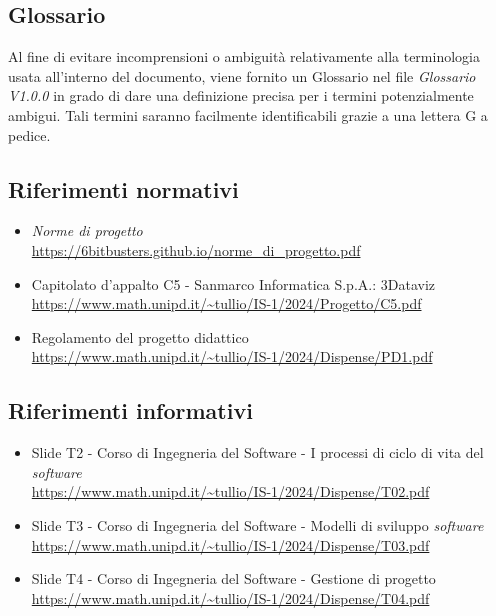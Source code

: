 \subsection{Glossario}
Al fine di evitare incomprensioni o ambiguità relativamente alla terminologia
usata all'interno del documento, viene fornito un Glossario nel file
\textit{Glossario V1.0.0} in grado di dare una definizione precisa per i
termini potenzialmente ambigui. Tali termini saranno facilmente identificabili
grazie a una lettera G a pedice.
\subsection{Riferimenti normativi}
\begin{itemize}
      \item \textit{Norme di progetto} \\ \url{https://6bitbusters.github.io/norme_di_progetto.pdf}
      \item Capitolato d'appalto C5 - Sanmarco Informatica S.p.A.: 3Dataviz \\ \url{https://www.math.unipd.it/~tullio/IS-1/2024/Progetto/C5.pdf}
      \item Regolamento del progetto didattico \\ \url{https://www.math.unipd.it/~tullio/IS-1/2024/Dispense/PD1.pdf}
\end{itemize}
\subsection{Riferimenti informativi}
\begin{itemize}
      \item Slide T2 - Corso di Ingegneria del Software - I processi di ciclo di vita del \textit{software} \\ \url{https://www.math.unipd.it/~tullio/IS-1/2024/Dispense/T02.pdf}
      \item Slide T3 - Corso di Ingegneria del Software - Modelli di sviluppo \textit{software} \\ \url{https://www.math.unipd.it/~tullio/IS-1/2024/Dispense/T03.pdf}
      \item Slide T4 - Corso di Ingegneria del Software - Gestione di progetto \\ \url{https://www.math.unipd.it/~tullio/IS-1/2024/Dispense/T04.pdf}
\end{itemize}
